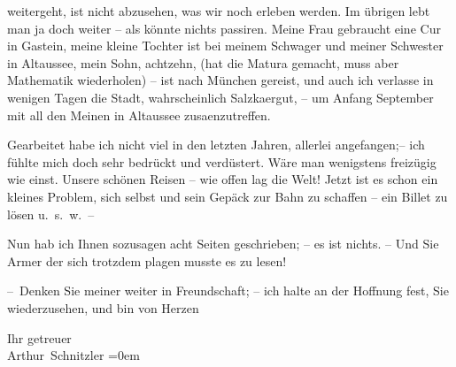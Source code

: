                weitergeht, ist nicht abzusehen, was wir noch erleben werden. Im übrigen lebt man ja
               doch weiter – als könnte nichts passiren. Meine Frau gebraucht eine Cur in Gastein, meine kleine Tochter ist bei meinem Schwager und meiner Schwester in Altaussee, mein Sohn, achtzehn, (hat die
               Matura gemacht, muss aber Mathematik wiederholen) – ist nach München gereist, und auch ich verlasse in wenigen Tagen die
               Stadt, wahrschein{\pb}lich Salzka{\geminationm}ergut, – um Anfang September
               mit all den Meinen in Altaussee zusa{\geminationm}enzutreffen.\pend
           
\pstart
           Gearbeitet habe ich nicht viel in den letzten Jahren, allerlei angefangen;– ich
               fühlte mich doch sehr bedrückt und verdüstert. Wäre man wenigstens freizügig wie
               einst. Unsere schönen Reisen – wie offen lag die Welt! Jetzt ist es schon ein kleines
               Problem, sich selbst und sein Gepäck zur Bahn zu schaffen – ein Billet zu lösen
               u. s. w. –\pend
           
\pstart
           Nun hab ich Ihnen sozusagen acht Seiten geschrieben; – es ist nichts. – Und Sie Armer
               der sich trotzdem plagen musste es zu lesen!\pend
           
\pstart
           – Denken Sie meiner weiter in Freundschaft; – ich halte an der Hoffnung fest, Sie
               wiederzusehen, und bin von Herzen\pend
           
\pstart
           Ihr getreuer{\\[\baselineskip]}\spacefill\mbox{Arthur Schnitzler}\pend
           \leftskip=0em{}\endnumbering{}  \newcommand{\dateiname}{L02353}\newcommand{\titel}{Arthur Schnitzler an Georg Brandes, 16. 8. 1920}\newcommand{\editorInnen}{Martin Anton Müller und Gerd-Hermann Susen}
